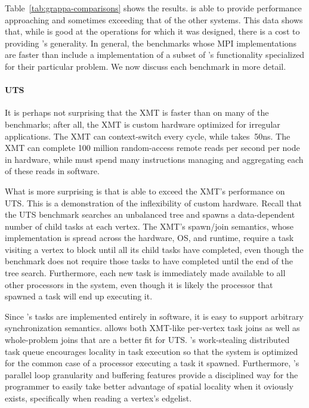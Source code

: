 Table~\ref{tab:grappa-comparisons} shows the results. \Grappa is able
to provide performance approaching and sometimes exceeding that of the
other systems. This data shows that, while \Grappa is good at the
operations for which it was designed, there is a cost to providing
\Grappa's generality. In general, the benchmarks whose MPI
implementations are faster than \Grappa include a implementation of a
subset of \Grappa's functionality specialized for their particular
problem. We now discuss each benchmark in more detail.

\paragraph{UTS}
It is perhaps not surprising that the XMT is faster than
\Grappa on many of the benchmarks; after all, the XMT is custom
hardware optimized for irregular applications. The XMT can
context-switch every cycle, while \Grappa takes $~$50ns. The XMT can
complete 100 million random-access remote reads per second per node in
hardware, while \Grappa must spend many instructions managing and
aggregating each of these reads in software.

What is more surprising is that \Grappa is able to exceed the XMT's
performance on UTS. This is a demonstration of the inflexibility of
custom hardware. Recall that the UTS benchmark searches an unbalanced
tree and spawns a data-dependent number of child tasks at each
vertex. The XMT's spawn/join semantics, whose implementation is spread
across the hardware, OS, and runtime, require a task visiting a vertex
to block until all its child tasks have completed, even though the
benchmark does not require those tasks to have completed until the end
of the tree search. Furthermore, each new task is immediately made
available to all other processors in the system, even though it is
likely the processor that spawned a task will end up executing it.

Since \Grappa's tasks are implemented entirely in software, it is easy
to support arbitrary synchronization semantics. \Grappa allows both
XMT-like per-vertex task joins as well as whole-problem joins that are
a better fit for UTS\@. \Grappa's work-stealing distributed
task queue encourages locality in task
execution so that the system is optimized for the common case of a
processor executing a task it spawned. Furthermore, \Grappa's parallel
loop granularity and buffering features provide a disciplined way for the programmer to easily take better
advantage of spatial locality when it oviously exists,
specifically when reading a vertex's edgelist.

